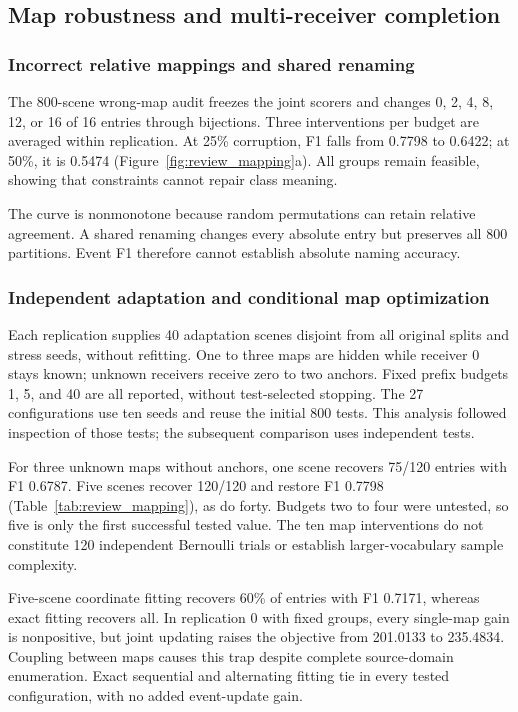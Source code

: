 \subsection{Map robustness and multi-receiver completion}\label{sec:map_revision}
\subsubsection{Incorrect relative mappings and shared renaming}
The 800-scene wrong-map audit freezes the joint scorers and changes 0, 2, 4, 8, 12, or 16 of 16 entries through bijections. Three interventions per budget are averaged within replication. At 25\% corruption, F1 falls from 0.7798 to 0.6422; at 50\%, it is 0.5474 (Figure~\ref{fig:review_mapping}a). All groups remain feasible, showing that constraints cannot repair class meaning.

The curve is nonmonotone because random permutations can retain relative agreement. A shared renaming changes every absolute entry but preserves all 800 partitions. Event F1 therefore cannot establish absolute naming accuracy.

\subsubsection{Independent adaptation and conditional map optimization}
Each replication supplies 40 adaptation scenes disjoint from all original splits and stress seeds, without refitting. One to three maps are hidden while receiver 0 stays known; unknown receivers receive zero to two anchors. Fixed prefix budgets 1, 5, and 40 are all reported, without test-selected stopping. The 27 configurations use ten seeds and reuse the initial 800 tests. This analysis followed inspection of those tests; the subsequent comparison uses independent tests.

For three unknown maps without anchors, one scene recovers 75/120 entries with F1 0.6787. Five scenes recover 120/120 and restore F1 0.7798 (Table~\ref{tab:review_mapping}), as do forty. Budgets two to four were untested, so five is only the first successful tested value. The ten map interventions do not constitute 120 independent Bernoulli trials or establish larger-vocabulary sample complexity.

Five-scene coordinate fitting recovers 60\% of entries with F1 0.7171, whereas exact fitting recovers all. In replication 0 with fixed groups, every single-map gain is nonpositive, but joint updating raises the objective from 201.0133 to 235.4834. Coupling between maps causes this trap despite complete source-domain enumeration. Exact sequential and alternating fitting tie in every tested configuration, with no added event-update gain.

